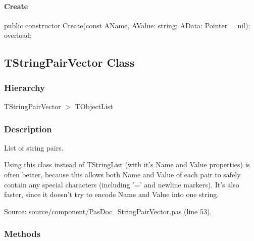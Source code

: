 \documentclass{report}
\newif\ifpdf
\begin{document}
\paragraph*{Create}\hspace*{\fill}

\label{PasDoc_StringPairVector.TStringPair-Create}
\begin{list}{}{
\setlength{\itemindent}{0cm}
\setlength{\listparindent}{0cm}
\setlength{\leftmargin}{\evensidemargin}
\addtolength{\leftmargin}{\tmplength}
\settowidth{\labelsep}{X}
\addtolength{\leftmargin}{\labelsep}
\setlength{\labelwidth}{\tmplength}
}
\item[\textbf{Declaration}\hfill]
\ifpdf
\begin{flushleft}
\fi
\begin{ttfamily}
public constructor Create(const AName, AValue: string; AData: Pointer = nil); overload;\end{ttfamily}

\ifpdf
\end{flushleft}
\fi

\end{list}
\ifpdf
\subsection*{\large{\textbf{TStringPairVector Class}}\normalsize\hspace{1ex}\hrulefill}
\else
\subsection*{TStringPairVector Class}
\fi
\label{PasDoc_StringPairVector.TStringPairVector}
\subsubsection*{\large{\textbf{Hierarchy}}\normalsize\hspace{1ex}\hfill}
TStringPairVector {$>$} TObjectList
\subsubsection*{\large{\textbf{Description}}\normalsize\hspace{1ex}\hfill}
List of string pairs.

Using this class instead of TStringList (with it's Name and Value properties) is often better, because this allows both Name and Value of each pair to safely contain any special characters (including '=' and newline markers). It's also faster, since it doesn't try to encode Name and Value into one string.\par
\href{https://github.com/pasdoc/pasdoc/blob/master/source/component/PasDoc_StringPairVector.pas#L53}{Source: source/component/PasDoc{\_}StringPairVector.pas (line 53).}\subsubsection*{\large{\textbf{Methods}}\normalsize\hspace{1ex}\hfill}
\end{document}

